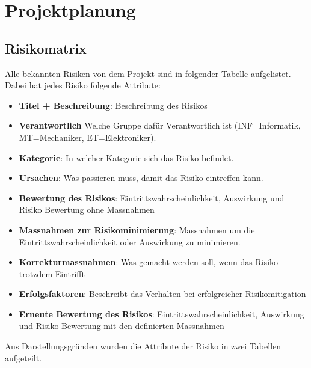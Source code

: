 \documentclass[../main.tex]{subfiles}
\begin{document}
\newpage
\section{Projektplanung}

\subsection{Risikomatrix} \label{risikomatrix}

Alle bekannten Risiken von dem Projekt sind in folgender Tabelle aufgelistet.
Dabei hat jedes Risiko folgende Attribute:
\begin{itemize}
    \item \textbf{Titel + Beschreibung}: Beschreibung des Risikos
    \item \textbf{Verantwortlich} Welche Gruppe dafür Verantwortlich ist (INF=Informatik, MT=Mechaniker, ET=Elektroniker).
    \item \textbf{Kategorie}: In welcher Kategorie sich das Risiko befindet.
    \item \textbf{Ursachen}: Was passieren muss, damit das Risiko eintreffen kann.
    \item \textbf{Bewertung des Risikos}: Eintrittswahrscheinlichkeit, Auswirkung und Risiko Bewertung ohne Massnahmen
    \item \textbf{Massnahmen zur Risikominimierung}: Massnahmen um die Eintrittswahrscheinlichkeit oder Auswirkung zu minimieren.
    \item \textbf{Korrekturmassnahmen}: Was gemacht werden soll, wenn das Risiko trotzdem Eintrifft
    \item \textbf{Erfolgsfaktoren}: Beschreibt das Verhalten bei erfolgreicher Risikomitigation
    \item \textbf{Erneute Bewertung des Risikos}: Eintrittswahrscheinlichkeit, Auswirkung und Risiko Bewertung mit den definierten Massnahmen
\end{itemize}

Aus Darstellungsgründen wurden die Attribute der Risiko in zwei Tabellen aufgeteilt.
\end{document}
